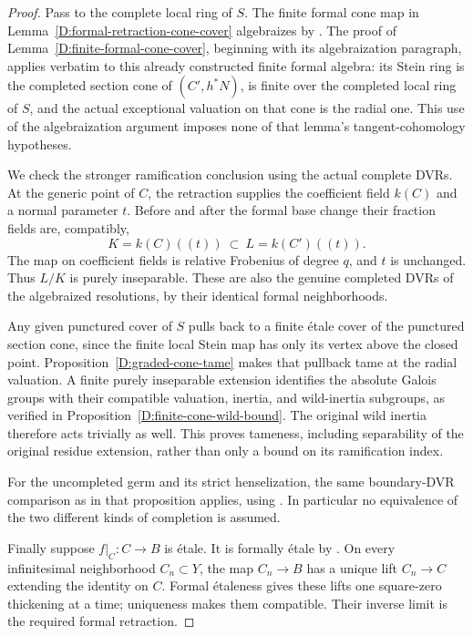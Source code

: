 \begin{proof}
Pass to the complete local ring of $S$.  The finite formal
cone map in Lemma~\ref{D:formal-retraction-cone-cover}
algebraizes by \cite[Lemma 30.28.2, tag 09ZT]
{StacksBFiniteCone}.  The proof of
Lemma~\ref{D:finite-formal-cone-cover}, beginning with its
algebraization paragraph, applies verbatim to this already
constructed finite formal algebra: its Stein ring is the
completed section cone of $(C',h^*N)$, is finite over the
completed local ring of $S$, and the actual exceptional
valuation on that cone is the radial one.  This use of the
algebraization argument imposes none of that lemma's
tangent-cohomology hypotheses.

We check the stronger ramification conclusion using the
actual complete DVRs.  At the generic point of $C$, the
retraction supplies the coefficient field $k(C)$ and a
normal parameter $t$.  Before and after the formal base
change their fraction fields are, compatibly,
\[
                 K=k(C)((t))\ \subset\ L=k(C')((t)).
\]
The map on coefficient fields is relative Frobenius of
degree $q$, and $t$ is unchanged.  Thus $L/K$ is purely
inseparable.  These are also the genuine completed DVRs
of the algebraized resolutions, by their identical formal
neighborhoods.

Any given punctured cover of $S$ pulls back to a finite
\'etale cover of the punctured section cone, since the
finite local Stein map has only its vertex above the
closed point.  Proposition~\ref{D:graded-cone-tame} makes
that pullback tame at the radial valuation.  A finite
purely inseparable extension identifies the absolute
Galois groups with their compatible valuation, inertia,
and wild-inertia subgroups, as verified in
Proposition~\ref{D:finite-cone-wild-bound}.  The original
wild inertia therefore acts trivially as well.  This
proves tameness, including separability of the original
residue extension, rather than only a bound on its
ramification index.

For the uncompleted germ and its strict henselization,
the same boundary-DVR comparison as in that proposition
applies, using \cite[Lemma 54.11.1, tag 0BG4]
{StacksBFiniteCone}.  In particular no equivalence of
the two different kinds of completion is assumed.

Finally suppose $f|_C:C\to B$ is \'etale.  It is formally
\'etale by \cite[Lemma 37.8.7, tag 04FF]
{StacksFormalRetractionRoot}.  On every infinitesimal
neighborhood $C_n\subset Y$, the map $C_n\to B$ has a
unique lift $C_n\to C$ extending the identity on $C$.
Formal \'etaleness gives these lifts one square-zero
thickening at a time; uniqueness makes them compatible.
Their inverse limit is the required formal retraction.
\end{proof}

